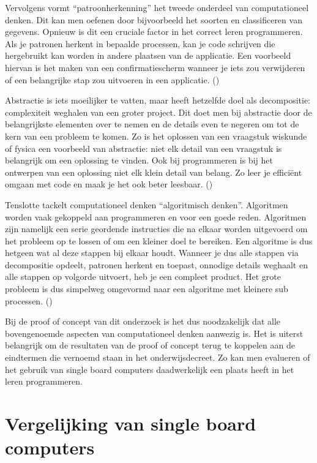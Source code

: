 Vervolgens vormt “patroonherkenning” het tweede onderdeel van computationeel denken. Dit kan men oefenen door bijvoorbeeld het soorten en classificeren van gegevens. Opnieuw is dit een cruciale factor in het correct leren programmeren. Als je patronen herkent in bepaalde processen, kan je code schrijven die hergebruikt kan worden in andere plaatsen van de applicatie. Een voorbeeld hiervan is het maken van een confirmatiescherm wanneer je iets zou verwijderen of een belangrijke stap zou uitvoeren in een applicatie.
(\cite{Smartschool})

Abstractie is iets moeilijker te vatten, maar heeft hetzelfde doel als decompositie: complexiteit weghalen van een groter project. Dit doet men bij abstractie door de belangrijkste elementen over te nemen en de details even te negeren om tot de kern van een probleem te komen. Zo is het oplossen van een vraagstuk wiskunde of fysica een voorbeeld van abstractie: niet elk detail van een vraagstuk is belangrijk om een oplossing te vinden. Ook bij programmeren is bij het ontwerpen van een oplossing niet elk klein detail van belang. Zo leer je efficiënt omgaan met code en maak je het ook beter leesbaar.
(\cite{Smartschool})

Tenslotte tackelt computationeel denken “algoritmisch denken”. Algoritmen worden vaak gekoppeld aan programmeren en voor een goede reden. Algoritmen zijn namelijk een serie geordende instructies die na elkaar worden uitgevoerd om het probleem op te lossen of om een kleiner doel te bereiken. Een algoritme is dus hetgeen wat al deze stappen bij elkaar houdt. Wanneer je dus alle stappen via decompositie opdeelt, patronen herkent en toepast, onnodige details weghaalt en alle stappen op volgorde uitvoert, heb je een compleet product. Het grote probleem is dus simpelweg omgevormd naar een algoritme met kleinere sub processen. 
(\cite{Smartschool})


Bij de proof of concept van dit onderzoek is het dus noodzakelijk dat alle bovengenoemde aspecten van computationeel denken aanwezig is. Het is uiterst belangrijk om de resultaten van de proof of concept terug te koppelen aan de eindtermen die vernoemd staan in het onderwijsdecreet. Zo kan men evalueren of het gebruik van single board computers daadwerkelijk een plaats heeft in het leren programmeren.


\section{Vergelijking van single board computers}

